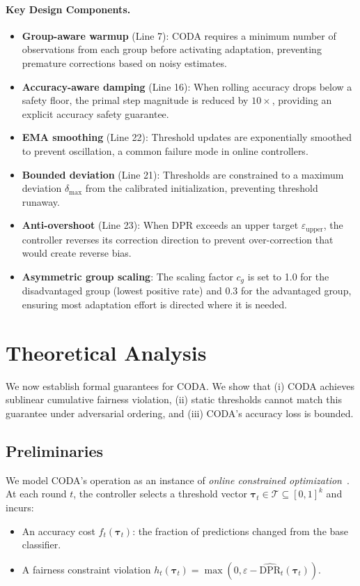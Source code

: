 \documentclass[10pt,twocolumn]{article}
\theoremstyle{definition}
\begin{document}
\paragraph{Key Design Components.}
\begin{itemize}
    \item \textbf{Group-aware warmup} (Line 7): CODA requires a minimum number of observations from each group before activating adaptation, preventing premature corrections based on noisy estimates.
    \item \textbf{Accuracy-aware damping} (Line 16): When rolling accuracy drops below a safety floor, the primal step magnitude is reduced by $10\times$, providing an explicit accuracy safety guarantee.
    \item \textbf{EMA smoothing} (Line 22): Threshold updates are exponentially smoothed to prevent oscillation, a common failure mode in online controllers.
    \item \textbf{Bounded deviation} (Line 21): Thresholds are constrained to a maximum deviation $\delta_{\max}$ from the calibrated initialization, preventing threshold runaway.
    \item \textbf{Anti-overshoot} (Line 23): When DPR exceeds an upper target $\varepsilon_{\text{upper}}$, the controller reverses its correction direction to prevent over-correction that would create reverse bias.
    \item \textbf{Asymmetric group scaling}: The scaling factor $c_g$ is set to 1.0 for the disadvantaged group (lowest positive rate) and 0.3 for the advantaged group, ensuring most adaptation effort is directed where it is needed.
\end{itemize}

\section{Theoretical Analysis}
\label{sec:theory}

We now establish formal guarantees for CODA. We show that (i) CODA achieves sublinear cumulative fairness violation, (ii) static thresholds cannot match this guarantee under adversarial ordering, and (iii) CODA's accuracy loss is bounded.

\subsection{Preliminaries}
We model CODA's operation as an instance of \emph{online constrained optimization}~\cite{mahdavi2012trading}. At each round $t$, the controller selects a threshold vector $\boldsymbol{\tau}_t \in \mathcal{T} \subseteq [0,1]^k$ and incurs:
\begin{itemize}
    \item An accuracy cost $f_t(\boldsymbol{\tau}_t)$: the fraction of predictions changed from the base classifier.
    \item A fairness constraint violation $h_t(\boldsymbol{\tau}_t) = \max(0, \varepsilon - \widehat{\text{DPR}}_t(\boldsymbol{\tau}_t))$.
\end{itemize}
\end{document}

